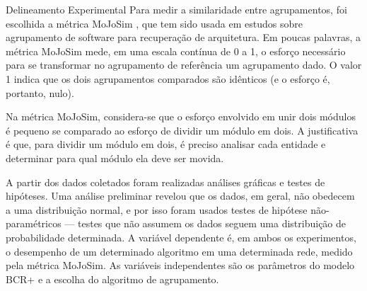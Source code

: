 \begin{section}{Delineamento Experimental}
	Para medir a similaridade entre agrupamentos, foi escolhida a métrica MoJoSim \cite{Tzerpos1999,Bittencourt2009}, que tem sido usada em estudos sobre agrupamento de software para recuperação de arquitetura. Em poucas palavras, a métrica MoJoSim mede, em uma escala contínua de 0 a 1, o esforço necessário para se transformar no agrupamento de referência um agrupamento dado. O valor 1 indica que os dois agrupamentos comparados são idênticos (e o esforço é, portanto, nulo). 
	
	Na métrica MoJoSim, considera-se que o esforço envolvido em unir dois módulos é pequeno se comparado ao esforço de dividir um módulo em dois. A justificativa é que, para dividir um módulo em dois, é preciso analisar cada entidade e determinar para qual módulo ela deve ser movida.


	A partir dos dados coletados foram realizadas análises gráficas e testes de hipóteses. Uma análise preliminar revelou que os dados, em geral, não obedecem a uma distribuição normal, e por isso foram usados testes de hipótese não-paramétricos --- testes que não assumem os dados seguem uma distribuição de probabilidade determinada. A variável dependente é, em ambos os experimentos, o desempenho de um determinado algoritmo em uma determinada rede, medido pela métrica MoJoSim. As variáveis independentes são os parâmetros do modelo BCR+ e a escolha do algoritmo de agrupamento.
	
	

\end{section}

